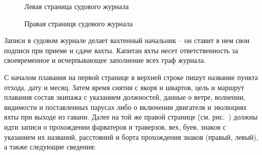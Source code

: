 \begin{figure}[htb]
  \begin{minipage}{0.49\textwidth}
    \centering{}
    \caption{Левая страница судового журнала}
    \label{fig:j-page-3}
  \end{minipage}
  \hfill\hfill
  \begin{minipage}{0.49\textwidth}
    \centering{}
    \caption{Правая страницв судового журнала}
    \label{fig:j-page-4}
  \end{minipage}
\end{figure} 

Записи в судовом журнале делает вахтенный начальник \--- он ставит в нем свои подписи при приеме и сдаче вахты. Капитан яхты несет ответственность за своевременное и исчерпывающее заполнение всех граф журнала.
 
С началом плавания на первой странице в верхней строке пишут название пункта отхода, дату и месяц. Затем время снятия с якоря и швартов, цель и маршрут плавания состав экипажа с указанием должностей, данные о ветре, волнении, видимости и поставленных парусах либо о включении двигателя и эволюциях яхты при выходе из гавани. Далее на той же правой странице (см. рис.~) должны идти записи о прохождении фарватеров и траверзов, вех, буев, знаков с указанием их названий, расстояний и борта прохождения знаков (правый, левый), а также следующие сведения:

